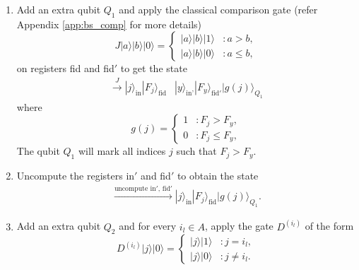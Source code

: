\documentclass[a4paper,twocolumn,11pt,unpublished]{quantumarticle}
\newcommand{\rang}{\rangle}
\begin{document}
\begin{enumerate}
            
        \item 
            Add an extra qubit $Q_1$ and apply the classical comparison gate (refer Appendix \ref{app:bs_comp} for more details)
        \begin{equation}
            J|a\rang |b\rang |0\rang = 
            \begin{cases}
                |a\rang |b\rang |1\rang &: a >b, \\
                |a\rang |b\rang |0\rang &: a \leq b,
            \end{cases}
        \end{equation} \label{jgate}
        on registers fid and fid$'$ to get the state
        \begin{equation}
            \begin{split}
                \xrightarrow{J}|j\rang_\text{in} |F_j\rang_\text{fid} &|y\rang_\text{in'} |F_y\rang_{\text{fid$'$}} |g(j)\rang_{Q_1}
            \end{split}
        \end{equation}
        where
        \begin{equation}
            g(j) = 
            \begin{cases}
                1 &: F_j >F_y, \\
                0 &: F_j \leq F_y,
            \end{cases}
        \end{equation}
        The qubit $Q_1$ will mark all indices $j$ such that $F_j > F_y$.
        \item 
            Uncompute the registers in$'$ and fid$'$ to obtain the state
            \begin{equation}
                \begin{split}
                    \xrightarrow{\text{uncompute in$'$, fid$'$}}|j\rang_\text{in} |F_j\rang_\text{fid}|g(j)\rang_{Q_1}.
                \end{split}
            \end{equation} \label{saving_m_qubits_fid}            
        \item 
            Add an extra qubit $Q_2$ and for every $i_l \in A$, apply the gate $D^{(i_l)}$ of the form 
            \begin{equation}\label{M_gate_fid}
            D ^ {(i_l)}|j\rang |0\rang = 
            \begin{cases}
                |j\rang |1\rang &: j = i_l,\\
                |j\rang |0\rang &: j \neq i_l. 
            \end{cases}
        \end{equation} \label{dgate}
            

\end{enumerate}
\end{document}
